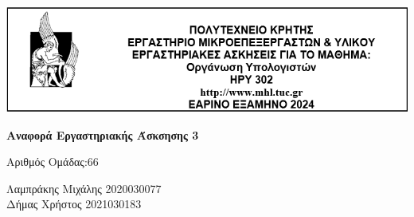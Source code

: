\begin{center}
    \vspace*{-2cm} %
    \centering
    \hspace*{-0.1cm} %
    \includegraphics[width=1\textwidth]{Images/Lab_Title.png} %
\end{center}

\vspace{1cm}

\centering
{ \large \bfseries Αναφορά Εργαστηριακής Άσκσησης 3} %

\vspace{0.5cm}

Αριθμός Ομάδας:66\\

\raggedright
Λαμπράκης Μιχάλης   \hspace{2em}        2020030077\\
Δήμας Χρήστος       \hspace{3.8em}      2021030183\\

\vspace{1cm}